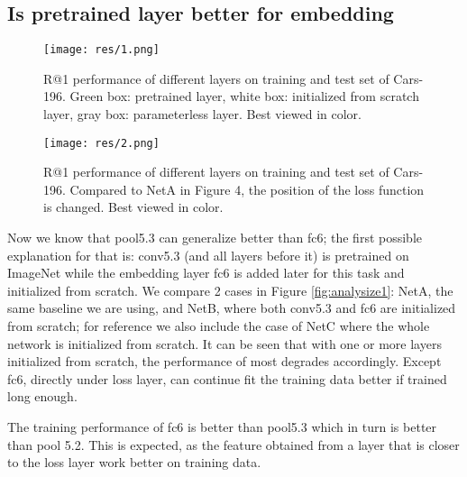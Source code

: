 \documentclass[10pt,twocolumn,letterpaper]{article}
\begin{document}

\subsection{Is pretrained layer better for embedding}

\begin{figure*}[h!]
\begin{center}
  \texttt{[image: res/1.png]}
  \vspace{5pt}
  \caption{R@1 performance of different layers on training and test set of Cars-196. Green box: pretrained layer, white box: initialized from scratch layer, gray box: parameterless layer. Best viewed in color.}
  \label{fig:analysize1}
\end{center}

\begin{center}
  \texttt{[image: res/2.png]}
  \vspace{5pt}
  \caption{R@1 performance of different layers on training and test set of Cars-196. Compared to NetA in Figure 4, the position of the loss function is changed. Best viewed in color.}
  \label{fig:analysize2}
\end{center}
\end{figure*}


Now we know that pool5.3 can generalize better than fc6; the first possible explanation for that is: conv5.3 (and all layers before it) is pretrained on ImageNet while the embedding layer fc6 is added later for this task and initialized from scratch. We compare 2 cases in Figure \ref{fig:analysize1}: NetA, the same baseline we are using, and NetB, where both conv5.3 and fc6 are initialized from scratch; for reference we also include the case of NetC where the whole network is initialized from scratch.
It can be seen that with one or more layers initialized from scratch, the performance of most degrades accordingly. Except fc6, directly under loss layer, can continue fit the training data better if trained long enough.

The training performance of fc6 is better than pool5.3 which in turn is better than pool 5.2. This is expected, as the feature obtained from a layer that is closer to the loss layer work better on training data.
\end{document}
